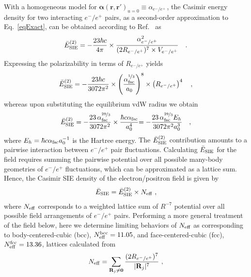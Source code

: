 \documentclass[aps,prl,twocolumn,showpacs,groupaddress]{revtex4-1}
\newcommand{\bbb}[1]{{\color{black}#1}}
\begin{document}
With a homogeneous model for ${\bm{\alpha}}(\mathbf{r},\mathbf{r}')_{u=0} \equiv \alpha_{e^-/e^+}\,$, the Casimir energy density for two interacting $e^-/e^+$ pairs, as a second-order approximation to
Eq.~\eqref{eqExact}, can be obtained according to Ref.~\cite{Casimir-Polder} as
\begin{equation}
\bar{E}_{\rm SIE}^{(2)} = - \frac{23 \hbar c}{4\pi} \times \frac{\alpha_{e^-/e^+}^2}{(2 R_{e^-/e^+})^7 \times V_{e^-/e^+}} \quad .  
\label{eqC2body}
\end{equation}
Expressing the polarizability in terms of $R_{e^-/e^+}$ yields
\begin{equation}
\bar{E}_{\rm SIE}^{(2)} = - \frac{23 \hbar c}{3072 \pi^2} \times \left(\frac{\alpha_{\rm fsc}^{\nicefrac{1}{3}}}{a_0}\right)^8 \times \left(R_{e^-/e^+}\right)^4  \quad ,  
\label{eqC2body_R4}
\end{equation}
whereas upon substituting the equilibrium vdW radius we obtain
\begin{equation}
\bar{E}_{\rm SIE}^{(2)} = - \frac{23\, \alpha_{\rm fsc}^{\nicefrac{29}{3}}}{3072 \pi^2} \times \frac{\hbar c \alpha_{\rm fsc}}{a_0^4} \bbb{ = - \frac{23\, \alpha_{\rm fsc}^{\nicefrac{29}{3}} E_h}{3072 \pi^2 a_0^3}} \quad ,
\label{eqC2bodynum}
\end{equation}
\bbb{where $E_h = \hbar c \alpha_{\rm fsc} a_0^{-1}$ is the Hartree energy.}
The $\bar{E}_{\rm SIE}^{(2)}$ contribution amounts to a pairwise interaction between $e^-/e^+$ pair fluctuations. Calculating $\bar{E}_{\rm SIE}$ for the field requires summing the pairwise potential over all possible many-body geometries of $e^-/e^+$ fluctuations, which can be approximated as a lattice sum. Hence, the Casimir SIE density of the electron/positron field is given by 
\begin{equation}
\bar{E}_{\rm SIE} = \bar{E}_{\rm SIE}^{(2)} \times N_{\rm eff}\ ,
\label{E_SIE_N_eff}
\end{equation}
where $N_{\rm eff}$ corresponds to a weighted lattice sum of $R^{-7}$ potential over all possible field arrangements of $e^-/e^+$ pairs. 
Performing a more general treatment of the field below, here we determine limiting behaviors of $N_{\rm eff}$ as corresponding to body-centered-cubic (bcc), $N_{\rm eff}^{\rm bcc}=11.05$, and face-centered-cubic (fcc), $N_{\rm eff}^{\rm fcc}=13.36$, lattices calculated from 
\begin{equation}
N_{\rm eff} = \sum\limits_{\mathbf{R}_j \ne \mathbf{0}}
\frac{(2 R_{e^-/e^+})^7}{|\mathbf{R}_j|^7}\ ,
\label{lattice_sum}
\end{equation}
\end{document}
